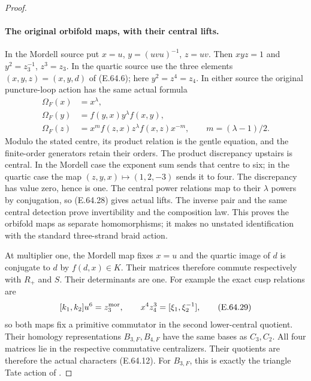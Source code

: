 \begin{proof}
\paragraph{The original orbifold maps, with their central lifts.}
In the Mordell source put
$x=u$, $y=(uvu)^{-1}$, $z=uv$.  Then $xyz=1$ and
$y^2=z_3^{-1}$, $z^3=z_3$.  In the quartic source use the
three elements $(x,y,z)=(x,y,d)$ of (E.64.6); here
$y^2=z^4=z_4$.  In either source the original puncture-loop
action has the same actual formula
\[
 \begin{split}
 \Omega_F(x)&=x^\lambda,\\
 \Omega_F(y)&=f(y,x)y^\lambda f(x,y),\\
 \Omega_F(z)&=x^m f(z,x)z^\lambda f(x,z)x^{-m},
                         \qquad m=(\lambda-1)/2.
 \end{split}
 \tag{E.64.28}
\]
Modulo the stated centre, its product relation is the gentle
equation, and the finite-order generators retain their orders.
The product discrepancy upstairs is central.  In the Mordell
case the exponent sum sends that centre to six; in the
quartic case the map $(z,y,x)\mapsto(1,2,-3)$ sends it to four.
The discrepancy has value zero, hence is one.  The central
power relations map to their $\lambda$ powers by conjugation,
so (E.64.28) gives actual lifts.  The inverse pair and the
same central detection prove invertibility and the composition
law.  This proves the orbifold maps as separate homomorphisms;
it makes no unstated identification with the standard
three-strand braid action.

At multiplier one, the Mordell map fixes $x=u$ and the
quartic image of $d$ is conjugate to $d$ by $f(d,x)\in K$.
Their matrices therefore commute respectively with $R_+$
and $S$.  Their determinants are one.  For example the exact
cusp relations are
\[
 [k_1,k_2]u^6=z_3^{\rm mor},\qquad
 x^4z_4^3=[\xi_1,\xi_2^{-1}],
 \tag{E.64.29}
\]
so both maps fix a primitive commutator in the second
lower-central quotient.  Their homology representations
$B_{3,F},B_{4,F}$ have the same bases as $C_3,C_2$.
All four matrices lie in the respective commutative
centralizers.  Their quotients are therefore the actual
characters (E.64.12).  For $B_{3,F}$, this is exactly the
triangle Tate action of
\cite[Proposition 4.4]{DE_NakamuraTsunogaiYasuda2010}.


\end{proof}
